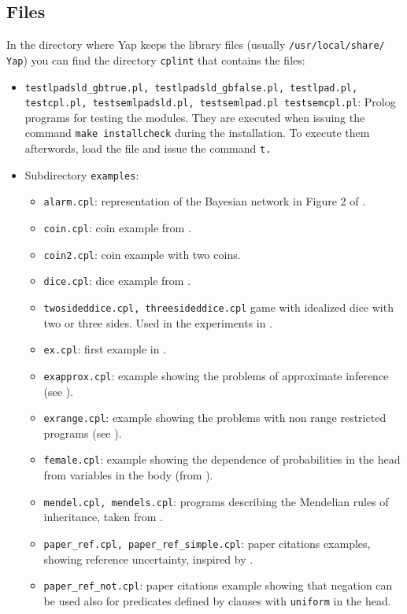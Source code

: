 \documentclass[a4paper,10pt]{scrartcl}
\begin{document}
\subsection{Files}
In the directory where Yap keeps the library files (usually \texttt{/usr/local/share/ Yap}) you can find the directory \texttt{cplint} that contains the files:
\begin{itemize}
\item \texttt{testlpadsld\_gbtrue.pl, testlpadsld\_gbfalse.pl, testlpad.pl,
testcpl.pl, testsemlpadsld.pl, testsemlpad.pl testsemcpl.pl}: Prolog programs for testing the modules. They are executed when issuing the command \texttt{make installcheck} during the installation. To execute them afterwords, load the file and issue the command \texttt{t.} 
\item Subdirectory \texttt{examples}:
\begin{itemize}
\item \texttt{alarm.cpl}: representation of the Bayesian network in Figure 2 of
 \cite{VenVer04-ICLP04-IC}.
\item \texttt{coin.cpl}: coin example from   \cite{VenVer04-ICLP04-IC}.
\item \texttt{coin2.cpl}: coin example with two coins.
\item \texttt{dice.cpl}: dice example from \cite{VenVer04-ICLP04-IC}.
\item \verb|twosideddice.cpl, threesideddice.cpl|  game with idealized dice with two or three  sides. Used in the experiments in \cite{Rig-RCRA07-IC}.
\item \texttt{ex.cpl}: first example in \cite{Rig-RCRA07-IC}.
\item \texttt{exapprox.cpl}: example showing the problems of approximate inference (see \cite{Rig-RCRA07-IC}).
\item \texttt{exrange.cpl}: example showing the problems with non range restricted programs (see \cite{Rig-RCRA07-IC}).
\item \texttt{female.cpl}: example showing the dependence of probabilities in the head from variables in the body (from \cite{VenVer04-ICLP04-IC}).
\item \texttt{mendel.cpl, mendels.cpl}: programs describing the Mendelian rules of inheritance, taken from \cite{Blo04-ILP04WIP-IC}.
\item \verb|paper_ref.cpl, paper_ref_simple.cpl|: paper citations examples, showing reference uncertainty, inspired by \cite{Getoor+al:JMLR02}.
\item \verb|paper_ref_not.cpl|: paper citations example showing that negation can be used also for predicates defined by clauses with \texttt{uniform} in the head.

\end{itemize}
\end{itemize}
\end{document}
